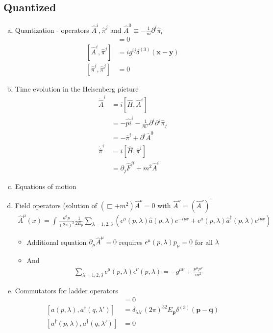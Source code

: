 \documentclass[10pt,a4paper]{report}
\theoremstyle{definition}
\begin{document}
\subsection{Quantized}
\begin{enumerate}[a)]
\item Quantization - operators $\hat{A}^i, \hat{\pi}^j$ and $\hat{A}^0\equiv-\frac{1}{m}\partial^i\hat{\pi}_i$
\begin{align}
[\hat{A}^i,\hat{A}^j]&=0\\
[\hat{A}^i,\hat{\pi}^j]&=ig^{ij}\delta^{(3)}(\mathbf{x}-\mathbf{y})\\
[\hat{\pi}^i,\hat{\pi}^j]&=0
\end{align}

\item Time evolution in the Heisenberg picture
\begin{align}
\dot{\hat{A}}^i
&=i[\hat{H},\hat{A}^i]\\
&=-\hat{pi}^i-\frac{1}{m^2}\partial^i\partial^j\hat{\pi}_j\\
&=-\hat{\pi}^i+\partial^i\hat{A}^0\\
\dot{\hat{\pi}}^i
&=i[\hat{H},\hat{\pi}^i]\\
&=\partial_j\hat{F}^{ji}+m^2\hat{A}^i
\end{align}

\item Equations of motion

\item Field operators (solution of $(\Box+m^2)\hat{A}^\nu=0$ with $\hat{A}^\nu=(\hat{A}^\nu)^\dagger$
\begin{align}
\hat{A}^\mu(x)=\int\frac{d^3p}{(2\pi)^3}\frac{1}{2E_p}
\sum_{\lambda=1,2,3}\left(
\epsilon^\mu(p,\lambda)\hat{a}(p,\lambda) e^{-ipx}+
\epsilon^\mu(p,\lambda)\hat{a}^\dagger(p,\lambda) e^{ipx}
\right)
\end{align}
\begin{itemize}
\item Additional equation $\partial_\mu\hat{A}^\mu=0$ requires $\epsilon^\mu(p,\lambda) p_\mu=0$ for all $\lambda$
\item And
\begin{align}
\sum_{\lambda=1,2,3}\epsilon^\mu(p,\lambda)\epsilon^\nu(p,\lambda)=-g^{\mu\nu}+\frac{p^\mu p^\nu}{m^2}
\end{align}
\end{itemize}


\item Commutators for ladder operators
\begin{align}
[a(p,\lambda),a(q,\lambda')]
&=0\\
[a(p,\lambda),a^\dagger(q,\lambda')]
&=\delta_{\lambda\lambda'}(2\pi)^32E_\mathbf{p}\delta^{(3)}(\mathbf{p}-\mathbf{q})\\
[a^\dagger(p,\lambda),a^\dagger(q,\lambda')]
&=0
\end{align}


\end{enumerate}
\end{document}
